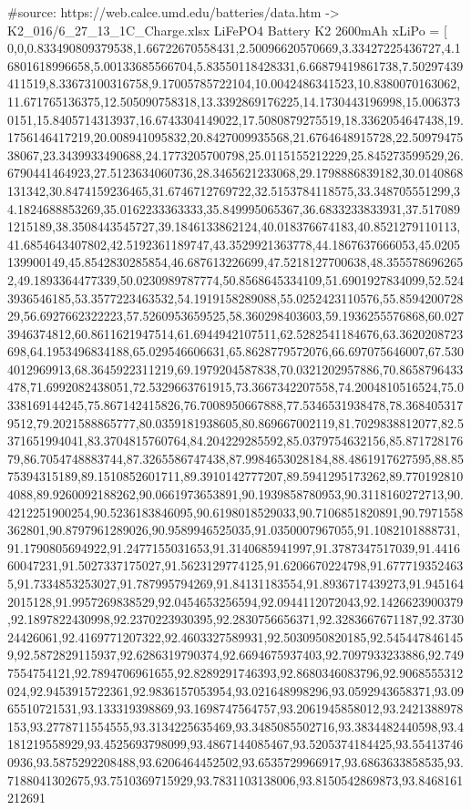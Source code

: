 \begin{pylabcode}[plotsession]
    
#source:  https://web.calce.umd.edu/batteries/data.htm -> K2_016/6_27_13_1C_Charge.xlsx   LiFePO4 Battery K2 2600mAh
xLiPo =  [ 0,0,0.833490809379538,1.66722670558431,2.50096620570669,3.33427225436727,4.16801618996658,5.00133685566704,5.83550118428331,6.66879419861738,7.50297439411519,8.33673100316758,9.17005785722104,10.0042486341523,10.8380070163062,11.671765136375,12.505090758318,13.3392869176225,14.1730443196998,15.0063730151,15.8405714313937,16.6743304149022,17.5080879275519,18.3362054647438,19.1756146417219,20.008941095832,20.8427009935568,21.6764648915728,22.5097947538067,23.3439933490688,24.1773205700798,25.0115155212229,25.845273599529,26.6790441464923,27.5123634060736,28.3465621233068,29.1798886839182,30.0140868131342,30.8474159236465,31.6746712769722,32.5153784118575,33.348705551299,34.1824688853269,35.0162233363333,35.849995065367,36.6833233833931,37.5170891215189,38.3508443545727,39.1846133862124,40.018376674183,40.8521279110113,41.6854643407802,42.5192361189747,43.3529921363778,44.1867637666053,45.0205139900149,45.8542830285854,46.687613226699,47.5218127700638,48.3555786962652,49.1893364477339,50.0230989787774,50.8568645334109,51.6901927834099,52.5243936546185,53.3577223463532,54.1919158289088,55.0252423110576,55.859420072829,56.6927662322223,57.5260953659525,58.360298403603,59.1936255576868,60.0273946374812,60.8611621947514,61.6944942107511,62.5282541184676,63.3620208723698,64.1953496834188,65.029546606631,65.8628779572076,66.697075646007,67.5304012969913,68.3645922311219,69.1979204587838,70.0321202957886,70.8658796433478,71.6992082438051,72.5329663761915,73.3667342207558,74.2004810516524,75.0338169144245,75.867142415826,76.7008950667888,77.5346531938478,78.3684053179512,79.2021588865777,80.0359181938605,80.869667002119,81.7029838812077,82.5371651994041,83.3704815760764,84.204229285592,85.0379754632156,85.87172817679,86.7054748883744,87.3265586747438,87.9984653028184,88.4861917627595,88.8575394315189,89.1510852601711,89.3910142777207,89.5941295173262,89.7701928104088,89.9260092188262,90.0661973653891,90.1939858780953,90.3118160272713,90.4212251900254,90.5236183846095,90.6198018529033,90.7106851820891,90.7971558362801,90.8797961289026,90.9589946525035,91.0350007967055,91.1082101888731,91.1790805694922,91.2477155031653,91.3140685941997,91.3787347517039,91.441660047231,91.5027337175027,91.5623129774125,91.6206670224798,91.6777193524635,91.7334853253027,91.787995794269,91.84131183554,91.8936717439273,91.9451642015128,91.9957269838529,92.0454653256594,92.0944112072043,92.1426623900379,92.1897822430998,92.2370223930395,92.2830756656371,92.3283667671187,92.373024426061,92.4169771207322,92.4603327589931,92.5030950820185,92.5454478461459,92.5872829115937,92.6286319790374,92.6694675937403,92.7097933233886,92.7497554754121,92.7894706961655,92.8289291746393,92.8680346083796,92.9068555312024,92.9453915722361,92.9836157053954,93.021648998296,93.0592943658371,93.0965510721531,93.133319398869,93.1698747564757,93.2061945858012,93.2421388978153,93.2778711554555,93.3134225635469,93.3485085502716,93.3834482440598,93.4181219558929,93.4525693798099,93.4867144085467,93.5205374184425,93.554137460936,93.5875292208488,93.6206464452502,93.6535729966917,93.6863633858535,93.7188041302675,93.7510369715929,93.7831103138006,93.8150542869873,93.8468161212691
\end{pylabcode}
